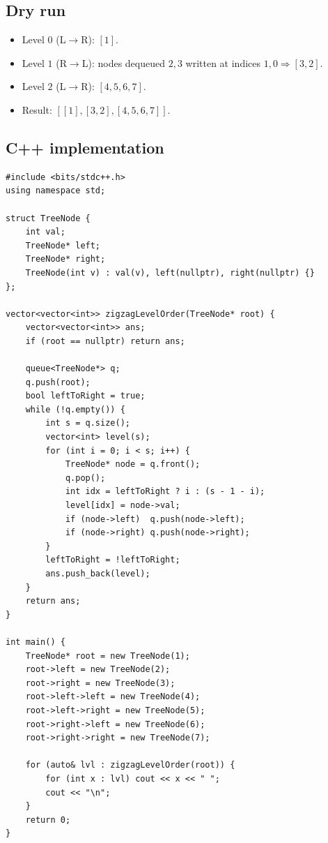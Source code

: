 \subsection*{Dry run}


\begin{itemize}
  \item Level $0$ (L$\to$R): $[1]$.
  \item Level $1$ (R$\to$L): nodes dequeued $2,3$ written at indices
        $1,0 \Rightarrow [3,2]$.
  \item Level $2$ (L$\to$R): $[4,5,6,7]$.
  \item Result: $[[1],[3,2],[4,5,6,7]]$.
\end{itemize}

\subsection*{C++ implementation}

\begin{lstlisting}
#include <bits/stdc++.h>
using namespace std;

struct TreeNode {
    int val;
    TreeNode* left;
    TreeNode* right;
    TreeNode(int v) : val(v), left(nullptr), right(nullptr) {}
};

vector<vector<int>> zigzagLevelOrder(TreeNode* root) {
    vector<vector<int>> ans;
    if (root == nullptr) return ans;

    queue<TreeNode*> q;
    q.push(root);
    bool leftToRight = true;
    while (!q.empty()) {
        int s = q.size();
        vector<int> level(s);
        for (int i = 0; i < s; i++) {
            TreeNode* node = q.front();
            q.pop();
            int idx = leftToRight ? i : (s - 1 - i);
            level[idx] = node->val;
            if (node->left)  q.push(node->left);
            if (node->right) q.push(node->right);
        }
        leftToRight = !leftToRight;
        ans.push_back(level);
    }
    return ans;
}

int main() {
    TreeNode* root = new TreeNode(1);
    root->left = new TreeNode(2);
    root->right = new TreeNode(3);
    root->left->left = new TreeNode(4);
    root->left->right = new TreeNode(5);
    root->right->left = new TreeNode(6);
    root->right->right = new TreeNode(7);

    for (auto& lvl : zigzagLevelOrder(root)) {
        for (int x : lvl) cout << x << " ";
        cout << "\n";
    }
    return 0;
}
\end{lstlisting}

